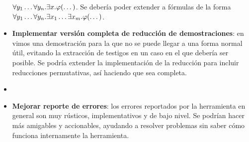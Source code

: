 \begin{itemize}
    $\forall y_1 \dots \forall y_n . \exists x .
    \varphi(\dots)$. Se debería poder extender a fórmulas de la forma $\forall
    y_1 \dots \forall y_n . \exists x_1 \dots \exists x_m .
    \varphi(\dots)$.
    \item \textbf{Implementar versión completa de reducción de demostraciones}:
    en  vimos una demostración para la que no
    se puede llegar a una forma normal útil, evitando la extracción de testigos
    en un caso en el que debería ser posible. Se podría extender la
    implementación de la reducción para incluir reducciones permutativas, así
    haciendo que sea completa.
    \item \textbf{}
    \item \textbf{Mejorar reporte de errores}: los errores reportados por la
    herramienta en general son muy rústicos, implementativos y de bajo nivel. Se
    podrían hacer más amigables y accionables, ayudando a resolver problemas sin
    saber cómo funciona internamente la herramienta.
\end{itemize}

